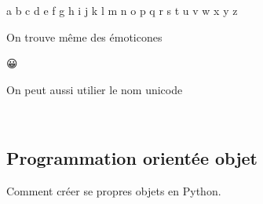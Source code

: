 \documentclass[letterpaper,10pt,english]{sphinxhowto}
\begin{document}
\begin{sphinxVerbatim}[commandchars=\\\{\}]
\PYG{p}{[}      \PYG{p}{]}
\end{sphinxVerbatim}

\begin{sphinxVerbatim}[commandchars=\\\{\}]
\PYGZsq{}a b c d e f g h i j k l m n o p q r s t u v w x y z\PYGZsq{}
\end{sphinxVerbatim}

\sphinxAtStartPar
On trouve même des émoticones

\begin{sphinxVerbatim}[commandchars=\\\{\}]
  
\end{sphinxVerbatim}

\begin{sphinxVerbatim}[commandchars=\\\{\}]
😀
\end{sphinxVerbatim}

\sphinxAtStartPar
On peut aussi utilier le nom unicode

\begin{sphinxVerbatim}[commandchars=\\\{\}]
\end{sphinxVerbatim}

\begin{sphinxVerbatim}[commandchars=\\\{\}]
🙂
\end{sphinxVerbatim}


\subsection{Programmation orientée objet}
\label{\detokenize{cours6_objet_cours:programmation-orientee-objet}}\label{\detokenize{cours6_objet_cours::doc}}
\sphinxAtStartPar
Comment créer se propres objets en Python.
\end{document}
